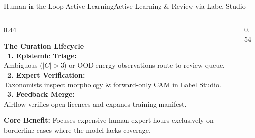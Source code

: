 \documentclass[aspectratio=169,10pt]{beamer}
\begin{document}
\begin{frame}{Human-in-the-Loop Active Learning}{Active Learning \& Review via Label Studio}
    \begin{columns}[T]
        \begin{column}{0.44\textwidth}
            \begin{purplecard}
                \textbf{\color{PurpleAccent} The Curation Lifecycle}\\[3pt]
                \textbullet\ \textbf{1. Epistemic Triage:}\\
                Ambiguous ($|C| > 3$) or OOD energy observations route to review queue.\\[3pt]
                \textbullet\ \textbf{2. Expert Verification:}\\
                Taxonomists inspect morphology \& forward-only CAM in Label Studio.\\[3pt]
                \textbullet\ \textbf{3. Feedback Merge:}\\
                Airflow verifies open licences and expands training manifest.
            \end{purplecard}
            \vspace{0.15cm}
            \begin{card}
                \centering\scriptsize
                \textbf{Core Benefit:} Focuses expensive human expert hours exclusively on borderline cases where the model lacks coverage.
            \end{card}
        \end{column}
        
        \begin{column}{0.54\textwidth}
            \centering
\end{column}
\end{columns}
\end{frame}
\end{document}
